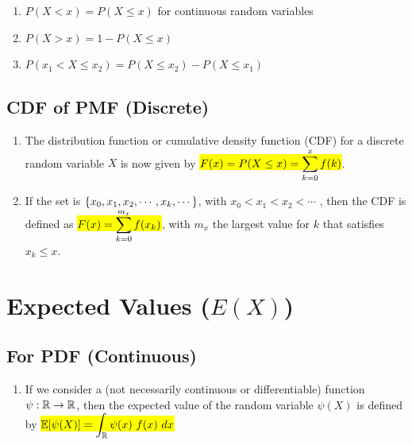 \begin{enumerate}
    \item $P(X < x) = P(X \leq x)$ for continuous random variables

    \item $P(X > x) = 1 - P(X \leq x)$
    \hfill \cite{statistics/book/Statistics-for-Data-Scientists/Maurits-Kaptein}

    \item $P( x_1 < X \leq x_2) = P(X \leq x_2) - P(X \leq x_1)$
    \hfill \cite{statistics/book/Statistics-for-Data-Scientists/Maurits-Kaptein}
\end{enumerate}



\subsection{CDF of PMF (Discrete)}

\begin{enumerate}
    \item The distribution function or cumulative density function (CDF) for a discrete random variable $X$ is now given by \colorbox{yellow}{$F(x) = P(X \leq x) = \displaystyle\sum^{x}_ {k=0} f (k)$}.
    \hfill \cite{statistics/book/Statistics-for-Data-Scientists/Maurits-Kaptein}

    \item If the set is $\left\{x_0, x_1, x_2, \cdots , x _k , \cdots\right\}$, with $x_0 < x_1 < x_2 < \cdots$ , then the CDF is defined as \colorbox{yellow}{$F(x) =\displaystyle\sum^{m_x} _{k=0} f (x _k )$}, with $m _x$ the largest value for $k$ that satisfies $x_ k \leq x$.
    \hfill \cite{statistics/book/Statistics-for-Data-Scientists/Maurits-Kaptein}
\end{enumerate}




\section{Expected Values ($E(X)$)}

\subsection{For PDF (Continuous)}

\begin{enumerate}
    \item If we consider a (not necessarily continuous or differentiable) function $\psi : \mathbb{R} \to \mathbb{R}$, then the expected value of the random variable $\psi (X)$ is defined by
    \colorbox{yellow}{$
        \mathbb{E}[\psi(X)]
        = \displaystyle\int_{\mathbb{R}} \psi(x)\ f(x)\ dx
    $}
    \hfill \cite{statistics/book/Statistics-for-Data-Scientists/Maurits-Kaptein}
\end{enumerate}

